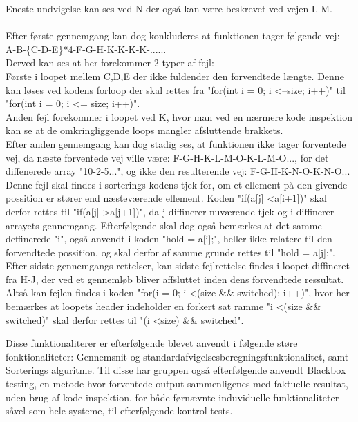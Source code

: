 \documentclass[11pt]{article}
\begin{document}
    Eneste undvigelse kan ses ved N der også kan være beskrevet ved vejen L-M.\\
    \\
    Efter første gennemgang kan dog konkluderes at funktionen tager følgende vej:\\
    A-B-\{C-D-E\}*4-F-G-H-K-K-K-K-......\\
    Derved kan ses at her forekommer 2 typer af fejl:\\
    Første i loopet mellem C,D,E der ikke fuldender den forvendtede længte. Denne kan løses ved kodens forloop der skal rettes fra "for(int i = 0; i \textless --size; i++)" til "for(int i = 0; i \textless= size; i++)".\\
    Anden fejl forekommer i loopet ved K, hvor man ved en nærmere kode inspektion kan se at de omkringliggende loops mangler afsluttende brakkets.\\
    Efter anden gennemgang kan dog stadig ses, at funktionen ikke tager forventede vej, da næste forventede vej ville være: F-G-H-K-L-M-O-K-L-M-O..., for det diffenerede array "10-2-5...", og ikke den resulterende vej: F-G-H-K-N-O-K-N-O...\\
    Denne fejl skal findes i sorterings kodens tjek for, om et ellement på den givende possition er stører end næsteværende ellement. Koden "if(a[j] \textless a[i+1])" skal derfor rettes til "if(a[j] \textgreater a[j+1])", da j diffinerer nuværende tjek og i diffinerer arrayets gennemgang. Efterfølgende skal dog også bemærkes at det samme deffinerede "i", også anvendt i koden "hold = a[i];", heller ikke relatere til den forvendtede possition, og skal derfor af samme grunde rettes til "hold = a[j];".\\
    Efter sidste gennemgangs rettelser, kan sidste fejlrettelse findes i loopet diffineret fra H-J, der ved et gennemløb bliver affsluttet inden dens forvendtede ressultat. Altså kan fejlen findes i koden "for(i = 0; i \textless (size \&\& switched); i++)", hvor her bemærkes at loopets header indeholder en forkert sat ramme "i \textless (size \&\& switched)" skal derfor rettes til "(i \textless size) \&\& switched".

    \noindent
    Disse funktionaliterer er efterfølgende blevet anvendt i følgende støre fonktionaliteter:
    Gennemsnit og standardafvigelsesberegningsfunktionalitet,
    samt Sorterings alguritme.
    Til disse har gruppen også efterfølgende anvendt Blackbox testing, en metode hvor forventede output sammenligenes med faktuelle resultat, uden brug af kode inspektion, for både førnævnte induviduelle funktionaliteter såvel som hele systeme, til efterfølgende kontrol tests.
    
\end{document}
